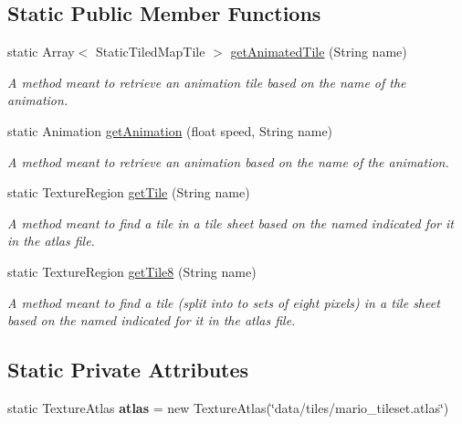 \subsection*{Static Public Member Functions}
\begin{DoxyCompactItemize}
\item 
static Array$<$ Static\+Tiled\+Map\+Tile $>$ \hyperlink{classnl_1_1arjanfrans_1_1mario_1_1graphics_1_1Tiles_a032fa48452ac57c65e8e86c23a28f0ee}{get\+Animated\+Tile} (String name)
\begin{DoxyCompactList}\small\item\em A method meant to retrieve an animation tile based on the name of the animation. \end{DoxyCompactList}\item 
static Animation \hyperlink{classnl_1_1arjanfrans_1_1mario_1_1graphics_1_1Tiles_a2448c85397533ac26d5c0159e7746e1a}{get\+Animation} (float speed, String name)
\begin{DoxyCompactList}\small\item\em A method meant to retrieve an animation based on the name of the animation. \end{DoxyCompactList}\item 
static Texture\+Region \hyperlink{classnl_1_1arjanfrans_1_1mario_1_1graphics_1_1Tiles_a33e1805fc683bac7f3883119857486eb}{get\+Tile} (String name)
\begin{DoxyCompactList}\small\item\em A method meant to find a tile in a tile sheet based on the named indicated for it in the atlas file. \end{DoxyCompactList}\item 
static Texture\+Region \hyperlink{classnl_1_1arjanfrans_1_1mario_1_1graphics_1_1Tiles_aec062c35528937ca08a65a3e5b120d91}{get\+Tile8} (String name)
\begin{DoxyCompactList}\small\item\em A method meant to find a tile (split into to sets of eight pixels) in a tile sheet based on the named indicated for it in the atlas file. \end{DoxyCompactList}\end{DoxyCompactItemize}
\subsection*{Static Private Attributes}
\begin{DoxyCompactItemize}
\item 
\mbox{\label{classnl_1_1arjanfrans_1_1mario_1_1graphics_1_1Tiles_a7de5b9b53e9a767b5ddf60b6b6e282e4}} 
static Texture\+Atlas {\bfseries atlas} = new Texture\+Atlas(\char`\"{}data/tiles/mario\+\_\+tileset.\+atlas\char`\"{})
\end{DoxyCompactItemize}



